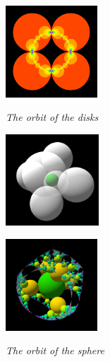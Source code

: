 \documentclass[uplatex, dvipdfmx]{article}
\begin{document}
\begin{figure}[htbp]
 \begin{minipage}[t]{0.3333\hsize}
  \center
  \includegraphics[height=1.35in, keepaspectratio]{../src/img/preparation/basic/circleOrbit.png}
  \caption{\textit{The orbit of the disks}}
  \label{fig:orbitCircles}
  \hspace*{\fill}
 \end{minipage}
 \begin{minipage}[t]{0.66666\hsize}
  \hspace*{\fill}
  \begin{minipage}[t]{0.3333\hsize}
   \center
   \includegraphics[height=1.35in, keepaspectratio]{../src/img/preparation/3dExtension/3dKissingGenerator.png}
   \label{fig:3dGen}
  \end{minipage}
  \hspace*{\fill}
  \begin{minipage}[t]{0.3333\hsize}
   \center
   \includegraphics[height=1.35in, keepaspectratio]{../src/img/preparation/3dExtension/3dOrbit.png}
   \label{fig:3dOrb}
  \hspace*{\fill}
  \end{minipage}
   \caption{\textit{The orbit of the sphere}}
  \label{fig:3d} 
 \end{minipage}
 \hspace*{\fill}
\end{figure}
\end{document}
